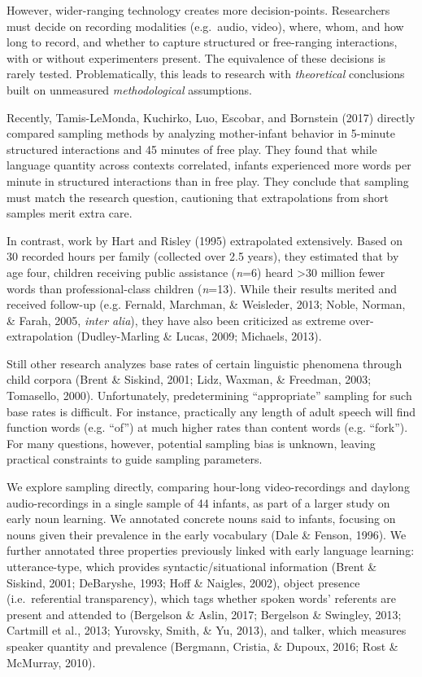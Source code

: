 \documentclass[man]{apa6}
\theoremstyle{definition}
\theoremstyle{definition}
\theoremstyle{definition}
\theoremstyle{remark}
\begin{document}
However, wider-ranging technology creates more decision-points.
Researchers must decide on recording modalities (e.g.~audio, video),
where, whom, and how long to record, and whether to capture structured
or free-ranging interactions, with or without experimenters present. The
equivalence of these decisions is rarely tested. Problematically, this
leads to research with \emph{theoretical} conclusions built on
unmeasured \emph{methodological} assumptions.

Recently, Tamis-LeMonda, Kuchirko, Luo, Escobar, and Bornstein (2017)
directly compared sampling methods by analyzing mother-infant behavior
in 5-minute structured interactions and 45 minutes of free play. They
found that while language quantity across contexts correlated, infants
experienced more words per minute in structured interactions than in
free play. They conclude that sampling must match the research question,
cautioning that extrapolations from short samples merit extra care.

In contrast, work by Hart and Risley (1995) extrapolated extensively.
Based on 30 recorded hours per family (collected over 2.5 years), they
estimated that by age four, children receiving public assistance
(\emph{n}=6) heard \textgreater{}30 million fewer words than
professional-class children (\emph{n}=13). While their results merited
and received follow-up (e.g. Fernald, Marchman, \& Weisleder, 2013;
Noble, Norman, \& Farah, 2005, \emph{inter alia}), they have also been
criticized as extreme over-extrapolation (Dudley-Marling \& Lucas, 2009;
Michaels, 2013).

Still other research analyzes base rates of certain linguistic phenomena
through child corpora (Brent \& Siskind, 2001; Lidz, Waxman, \&
Freedman, 2003; Tomasello, 2000). Unfortunately, predetermining
\enquote{appropriate} sampling for such base rates is difficult. For
instance, practically any length of adult speech will find function
words (e.g. \enquote{of}) at much higher rates than content words (e.g.
\enquote{fork}). For many questions, however, potential sampling bias is
unknown, leaving practical constraints to guide sampling parameters.

We explore sampling directly, comparing hour-long video-recordings and
daylong audio-recordings in a single sample of 44 infants, as part of a
larger study on early noun learning. We annotated concrete nouns said to
infants, focusing on nouns given their prevalence in the early
vocabulary (Dale \& Fenson, 1996). We further annotated three properties
previously linked with early language learning: utterance-type, which
provides syntactic/situational information (Brent \& Siskind, 2001;
DeBaryshe, 1993; Hoff \& Naigles, 2002), object presence
(i.e.~referential transparency), which tags whether spoken words'
referents are present and attended to (Bergelson \& Aslin, 2017;
Bergelson \& Swingley, 2013; Cartmill et al., 2013; Yurovsky, Smith, \&
Yu, 2013), and talker, which measures speaker quantity and prevalence
(Bergmann, Cristia, \& Dupoux, 2016; Rost \& McMurray, 2010).
\end{document}
